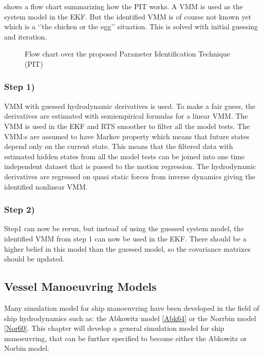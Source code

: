 \documentclass[review]{elsarticle}
\let\sphinxpxdimen\pdfpxdimen\else\newdimen\sphinxpxdimen
\begin{document}
\sphinxAtStartPar
{\hyperref[\detokenize{01.01_method:id1}]{}} shows a flow chart summarizing how the PIT works. A VMM is used as the system model in the EKF. But the identified VMM is of course not known yet which is a ‘’the chicken or the egg’’ situation. This is solved with initial guessing and iteration.

\begin{figure}[htbp]
\centering
\capstart

\noindent\sphinxincludegraphics[width=500\sphinxpxdimen]{{method}.png}
\caption{Flow chart over the proposed Parameter Identification Technique (PIT)}\label{\detokenize{01.01_method:id1}}\end{figure}


\subsubsection{Step 1)}
\label{\detokenize{01.01_method:step-1}}
\sphinxAtStartPar
VMM with guessed hydrodynamic derivatives is used. To make a fair guess, the derivatives are estimated with semiempirical formulas for a linear VMM. The VMM is used in the EKF and RTS smoother to filter all the model tests. The VMM:s are assumed to have Markov property which means that future states depend only on the current state. This means that the filtered data with estimated hidden states from all the model tests can be joined into one time independent dataset that is passed to the motion regression. The hydrodynamic derivatives are regressed on quasi static forces from inverse dynamics giving the identified nonlinear VMM.


\subsubsection{Step 2)}
\label{\detokenize{01.01_method:step-2}}
\sphinxAtStartPar
Step1 can now be rerun, but instead of using the guessed system model, the identified VMM from step 1 can now be used in the EKF. There should be a higher belief in this model than the guessed model, so the covariance matrixes should be updated.


\subsection{Vessel Manoeuvring Models}
\label{\detokenize{02.01_VMMs:vessel-manoeuvring-models}}\label{\detokenize{02.01_VMMs::doc}}
\sphinxAtStartPar
Many simulation model for ship manoeuvring have been developed in the field of ship hydrodynamics such as: the Abkowitz model {[}\hyperlink{cite.bibligraphy:id139}{Abk64}{]} or the Norrbin model {[}\hyperlink{cite.bibligraphy:id126}{Nor60}{]}.
This chapter will develop a general simulation model for ship manoeuvring, that can be further specified to become either the Abkowitz or Norbin model.
\end{document}

